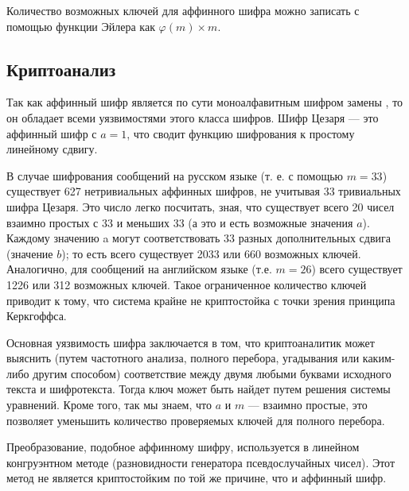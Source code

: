 Количество возможных ключей для аффинного шифра можно записать 
с помощью функции Эйлера как $\varphi(m) \times m$.

\subsection{Криптоанализ}

Так как аффинный шифр является по сути моноалфавитным шифром замены
, то он обладает всеми уязвимостями этого класса шифров. Шифр Цезаря —
это аффинный шифр с $a = 1$, что сводит функцию шифрования к простому 
линейному сдвигу.

В случае шифрования сообщений на русском языке (т. е. с помощью $m = 33$) 
существует 627 нетривиальных аффинных шифров, не учитывая 33 тривиальных шифра 
Цезаря. Это число легко посчитать, зная, что существует всего 20 чисел 
взаимно простых с 33 и меньших 33 (а это и есть возможные значения 
$a$). Каждому значению a могут соответствовать 33 разных дополнительных 
сдвига (значение $b$); то есть всего существует 2033 или 660 возможных 
ключей. Аналогично, для сообщений на английском языке (т.е. $m = 26$) 
всего существует 1226 или 312 возможных ключей. Такое ограниченное 
количество ключей приводит к тому, что система крайне не криптостойка 
с точки зрения принципа Керкгоффса.

Основная уязвимость шифра заключается в том, что криптоаналитик может 
выяснить (путем частотного анализа, полного перебора, угадывания или 
каким-либо другим способом) соответствие между двумя любыми буквами 
исходного текста и шифротекста. Тогда ключ может быть найдет путем 
решения системы уравнений. Кроме того, так мы знаем, что $a$ и $m$ — взаимно 
простые, это позволяет уменьшить количество проверяемых ключей для 
полного перебора.

Преобразование, подобное аффинному шифру, используется в линейном 
конгруэнтном методе (разновидности генератора псевдослучайных чисел).
Этот метод не является криптостойким по той же причине, что и аффинный 
шифр.

